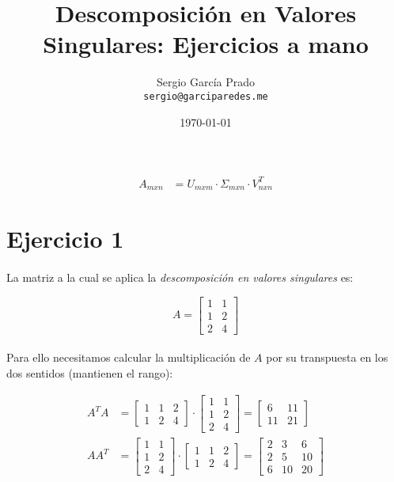 \documentclass[a4paper, spanish]{article}
\title{Descomposición en Valores Singulares: Ejercicios a mano}
\author{Sergio García Prado \\ \texttt{sergio@garciparedes.me}}
\date{\today}
\begin{document}
  \maketitle

  \begin{align}
    A_{mxn} &= U_{mxm} \cdot \Sigma_{mxn} \cdot V_{nxn}^T
  \end{align}

  \section{Ejercicio 1}

  \paragraph{}
  La matriz a la cual se aplica la \emph{descomposición en valores singulares} es:

  \begin{equation}
    A =
    \begin{bmatrix}
      1 & 1\\
      1 & 2\\
      2 & 4
    \end{bmatrix}
  \end{equation}

  \paragraph{}
  Para ello necesitamos calcular la multiplicación de $A$ por su transpuesta en los dos sentidos (mantienen el rango):

  \begin{align}
    A^T A &=
    \begin{bmatrix}
      1 & 1 & 2\\
      1 & 2 & 4
    \end{bmatrix}
    \cdot
    \begin{bmatrix}
      1 & 1\\
      1 & 2\\
      2 & 4
    \end{bmatrix}
    =
    \begin{bmatrix}
      6 & 11\\
      11 & 21
    \end{bmatrix} \\
    A A^T &=
    \begin{bmatrix}
      1 & 1\\
      1 & 2\\
      2 & 4
    \end{bmatrix}
    \cdot
    \begin{bmatrix}
      1 & 1 & 2\\
      1 & 2 & 4
    \end{bmatrix}
    =
    \begin{bmatrix}
      2 & 3 & 6 \\
      2 & 5 & 10 \\
      6 & 10 & 20
    \end{bmatrix} \\
  \end{align}
\end{document}
